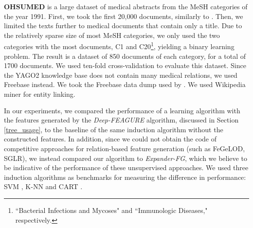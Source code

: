 \documentclass[twoside,11pt]{article}
\theoremstyle{definition}
\begin{document}
\textbf{OHSUMED}  is a large dataset of medical abstracts from the MeSH categories of the year 1991. 
First, we took the first 20,000 documents, similarly to .
Then, we limited the texts further to medical documents that contain only a title. %
Due to the relatively sparse size of most MeSH categories, we only used the two categories with the most documents, C1 and C20\footnote{``Bacterial Infections and Mycoses" and ``Immunologic Diseases," respectively.}, yielding a binary learning problem.
The result is a dataset of 850 documents of each category, for a total of 1700 documents.
We used ten-fold cross-validation to evaluate this dataset.
Since the YAGO2 knowledge base does not contain many medical relations, we used Freebase instead. We took the Freebase data dump used by .
We used Wikipedia miner \cite{milne2013open} for entity linking. 

In our experiments, we compared the performance of a learning algorithm with the features generated by the \emph{Deep-FEAGURE} algorithm, discussed in Section \ref{tree_usage}, to the baseline of the same induction algorithm without the constructed features. In addition, since we could not obtain the code of competitive approaches for relation-based feature generation (such as FeGeLOD, SGLR), we instead compared our algorithm to \emph{Expander-FG}, which we believe to be indicative of the performance of these unsupervised approaches.
We used three induction algorithms as benchmarks for measuring the difference in performance: SVM \cite{cortes1995support}, K-NN \cite{fix1951discriminatory} and CART \cite{breiman1984classification}.



\end{document}
